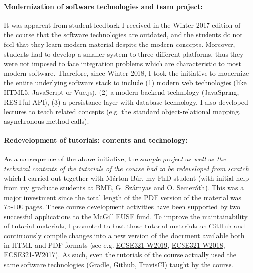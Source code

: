 \paragraph{Modernization of software technologies and team project:}
It was apparent from student feedback I received in the Winter 2017 edition of the course that the software technologies are outdated, and the students do not feel that they learn modern material despite the modern concepts. Moreover, students had to develop a smaller system to three different platforms, thus they were not imposed to face integration problems which are characteristic to most modern software.
Therefore, since Winter 2018, I took the initiative to modernize the entire underlying software stack to include (1) modern web technologies (like HTML5, JavaScript or Vue.js), (2) a modern backend technology (JavaSpring, RESTful API), (3) a persistance layer with database technology. I also developed lectures to teach related concepts (e.g. the standard object-relational mapping, asynchronous method calls).

\paragraph{Redevelopment of tutorials: contents and technology:}
As a consequence of the above initiative, the \emph{sample project as well as the technical contents of the tutorials of the course had to be redeveloped from scratch} which I carried out together with Márton Búr, my PhD student (with initial help from my graduate students at BME, G. Szárnyas and O. Semeráth). This was a major investment since the total length of the PDF version of the material was 75-100 pages. These course development activities have been supported by two successful applications to the McGill EUSF fund. 
To improve the maintainability of tutorial materials, I promoted to host those tutorial materials on GitHub and continuously compile changes into a new version of the document available both in HTML and PDF formats (see e.g. 
\href{https://mcgill-ecse321-winter2019.github.io/EventRegistration-Tutorials/}{ECSE321-W2019}, 
\href{https://mcgill-ecse321-winter2018.github.io/EventRegistration-Tutorials/}{ECSE321-W2018}, 
\href{https://ecse321-winter2017-mcgill.github.io/EventRegistration-Tutorials/}{ECSE321-W2017}). As such, even the tutorials of the course actually used the same software technologies (Gradle, Github, TravisCI) taught by the course. 


